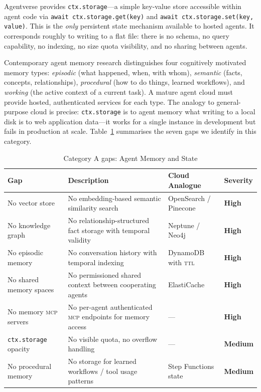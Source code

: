 \documentclass[twoside,11pt]{article}
\newcommand{\high}{\textcolor{red!70!black}{\textbf{High}}}
\newcommand{\medium}{\textcolor{orange!80!black}{\textbf{Medium}}}
\begin{document}
Agentverse provides \texttt{ctx.storage}---a simple key-value store accessible
within agent code via \texttt{await ctx.storage.get(key)} and
\texttt{await ctx.storage.set(key, value)}.  This is the \emph{only} persistent
state mechanism available to hosted agents.  It corresponds roughly to writing
to a flat file: there is no schema, no query capability, no indexing, no size
quota visibility, and no sharing between agents.

Contemporary agent memory research \citep{mem0blog2026,zepgraphiti2025,yang2026graphsurvey}
distinguishes four cognitively motivated memory types: \emph{episodic} (what
happened, when, with whom), \emph{semantic} (facts, concepts, relationships),
\emph{procedural} (how to do things, learned workflows), and \emph{working}
(the active context of a current task).  A mature agent cloud must provide
hosted, authenticated services for each type.  The analogy to general-purpose
cloud is precise: \texttt{ctx.storage} is to agent memory what writing to a
local disk is to web application data---it works for a single instance in
development but fails in production at scale.  Table~\ref{tab:gap-memory}
summarises the seven gaps we identify in this category.

\begin{table}[htbp]
\centering
\caption{Category A gaps: Agent Memory and State}
\label{tab:gap-memory}
\begin{tabular}{p{3.2cm} p{5.5cm} p{2.9cm} l}
\toprule
\textbf{Gap} & \textbf{Description} & \textbf{Cloud Analogue} &
\textbf{Severity} \\
\midrule
No vector store & No embedding-based semantic similarity search & OpenSearch /
Pinecone & \high \\[4pt]
No knowledge graph & No relationship-structured fact storage with temporal
validity & Neptune / Neo4j & \high \\[4pt]
No episodic memory & No conversation history with temporal indexing & DynamoDB
with \textsc{ttl} & \high \\[4pt]
No shared memory spaces & No permissioned shared context between cooperating
agents & ElastiCache & \high \\[4pt]
No memory \textsc{mcp} servers & No per-agent authenticated \textsc{mcp}
endpoints for memory access & --- & \high \\[4pt]
\texttt{ctx.storage} opacity & No visible quota, no overflow handling & --- &
\medium \\[4pt]
No procedural memory & No storage for learned workflows / tool usage patterns &
Step Functions state & \medium \\
\bottomrule
\end{tabular}
\end{table}
\end{document}
